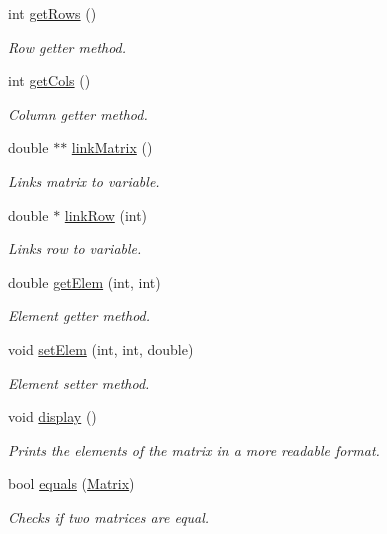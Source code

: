 \begin{DoxyCompactItemize}
int \hyperlink{classMatrix_a756736b31a372037de52b9ed83bc06b3}{get\+Rows} ()
\begin{DoxyCompactList}\small\item\em Row getter method. \end{DoxyCompactList}\item 
int \hyperlink{classMatrix_a718a524577eb195b94e8abb7c87109a5}{get\+Cols} ()
\begin{DoxyCompactList}\small\item\em Column getter method. \end{DoxyCompactList}\item 
double $\ast$$\ast$ \hyperlink{classMatrix_a0d0a0bd2c4b2de17f34e9b233b6b03f7}{link\+Matrix} ()
\begin{DoxyCompactList}\small\item\em Links matrix to variable. \end{DoxyCompactList}\item 
double $\ast$ \hyperlink{classMatrix_a9a98da6cf9820fa14d6077d3ef0b83d7}{link\+Row} (int)
\begin{DoxyCompactList}\small\item\em Links row to variable. \end{DoxyCompactList}\item 
double \hyperlink{classMatrix_aaaf559a0afb0412c23d6f9485bbf94a8}{get\+Elem} (int, int)
\begin{DoxyCompactList}\small\item\em Element getter method. \end{DoxyCompactList}\item 
void \hyperlink{classMatrix_a637385af993e73bb5e3c93fd9452b7c0}{set\+Elem} (int, int, double)
\begin{DoxyCompactList}\small\item\em Element setter method. \end{DoxyCompactList}\item 
\mbox{\label{classMatrix_a780772b48a2e99f4995bc97f1b856323}} 
void \hyperlink{classMatrix_a780772b48a2e99f4995bc97f1b856323}{display} ()
\begin{DoxyCompactList}\small\item\em Prints the elements of the matrix in a more readable format. \end{DoxyCompactList}\item 
bool \hyperlink{classMatrix_a788b59f09c9ff8a0c9d1c4377a4d8409}{equals} (\hyperlink{classMatrix}{Matrix})
\begin{DoxyCompactList}\small\item\em Checks if two matrices are equal. \end{DoxyCompactList}\item 
$$
\end{DoxyCompactItemize}
